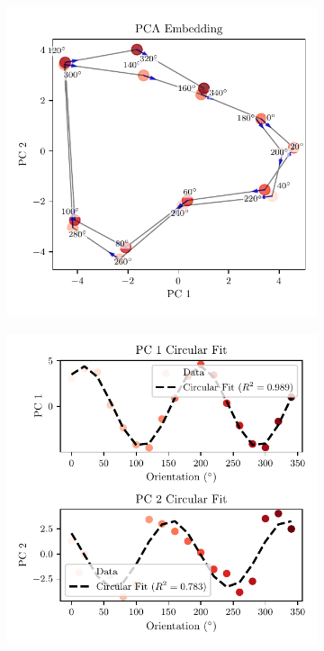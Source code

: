 \documentclass[11pt,a4paper]{article}
\begin{document}
\begin{figure}[h!]
    \centering
    \begin{subfigure}[b]{0.48\textwidth}
        \centering
        \includegraphics[width=\textwidth]{results/mouse_circular_colormap_visualization.pdf}
     
        \label{fig:mouse_colormap}
    \end{subfigure}
    \hfill
    \begin{subfigure}[b]{0.48\textwidth}
        \centering
        \includegraphics[width=\textwidth]{results/mouse_circular_regression.pdf}


\end{subfigure}
\end{figure}
\end{document}
